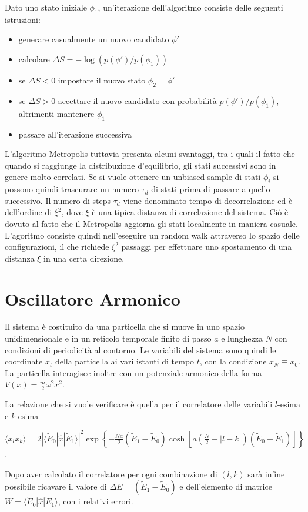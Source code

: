 Dato uno stato iniziale $\phi_1$, un'iterazione dell'algoritmo consiste delle seguenti istruzioni:
\begin{itemize}
    \item generare casualmente un nuovo candidato $\phi'$
    \item calcolare $\Delta S = -\log(p(\phi')/p(\phi_1))$
    \item se $\Delta S < 0$ impostare il nuovo stato $\phi_2=\phi'$
    \item se $\Delta S > 0$ accettare il nuovo candidato con probabilità $p(\phi')/p(\phi_1)$, altrimenti mantenere $\phi_1$
    \item passare all'iterazione successiva
\end{itemize}
L'algoritmo Metropolis tuttavia presenta alcuni svantaggi, tra i quali il fatto che quando si raggiunge la distribuzione d'equilibrio, gli stati successivi sono in genere molto correlati. Se si vuole ottenere un unbiased sample di stati $\phi_i$ si possono quindi trascurare un numero $\tau_d$ di stati prima di passare a quello successivo. Il numero di steps $\tau_d$ viene denominato tempo di decorrelazione ed è dell'ordine di $\xi^2$, dove $\xi$ è una tipica distanza di correlazione del sistema. Ciò è dovuto al fatto che il Metropolis aggiorna gli stati localmente in maniera casuale. L'agoritmo consiste quindi nell'eseguire un random walk attraverso lo spazio delle configurazioni, il che richiede $\xi^2$ passaggi per effettuare uno spostamento di una distanza $\xi$ in una certa direzione.

\section{Oscillatore Armonico}
Il sistema è costituito da una particella che si muove in uno spazio unidimensionale e in un reticolo temporale finito di passo $a$ e lunghezza $N$ con condizioni di periodicità al contorno. Le variabili del sistema sono quindi le coordinate $x_t$ della particella ai vari istanti di tempo $t$, con la condizione $x_N \equiv x_0$. La particella interagisce inoltre con un potenziale armonico della forma $V(x) = \frac{m}{2}\omega^2 x^2$.

La relazione che si vuole verificare è quella per il correlatore delle variabili $l$-esima e $k$-esima
\begin{center}
\small
$\langle x_l x_k\rangle = 2|\langle\tilde{E}_0|\hat{x}|\tilde{E}_1\rangle|^2\exp\left\{-\frac{Na}{2}(\tilde{E}_1-\tilde{E}_0)\cosh\left[a\left(\frac{N}{2}-|l-k|\right)(\tilde{E}_0-\tilde{E}_1)\right]\right\}$.
\end{center}
Dopo aver calcolato il correlatore per ogni combinazione di $(l,k)$ sarà infine possibile ricavare il valore di $\Delta E=(\tilde{E}_1-\tilde{E}_0)$ e dell'elemento di matrice $W=\langle\tilde{E}_0|\hat{x}|\tilde{E}_1\rangle$, con i relativi errori.

